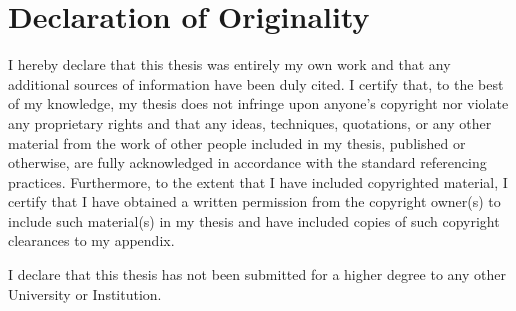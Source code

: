 \section*{Declaration of Originality}
I hereby declare that this thesis was entirely my own work and that any additional sources of information have been duly cited.
I certify that, to the best of my knowledge, my thesis does not infringe upon anyone's copyright nor violate any proprietary rights and that any ideas, techniques, quotations, or any other material from the work of other people included in my thesis, published or otherwise, are fully acknowledged in accordance with the standard referencing practices. Furthermore, to the extent that I have included copyrighted material, I certify that I have obtained a written permission from the copyright owner(s) to include such material(s) in my thesis and have included copies of such copyright clearances to my appendix. 
 
I declare that this thesis has not been submitted for a higher degree to any other University or Institution.
